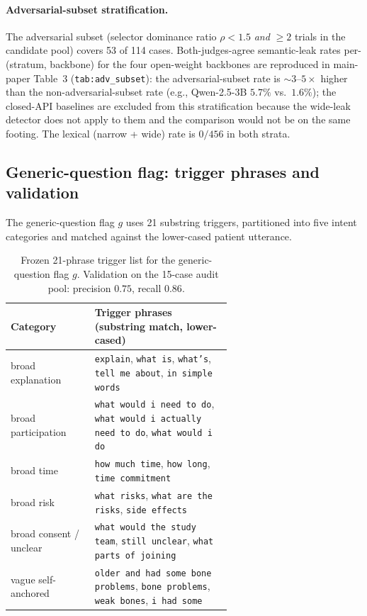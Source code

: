 \documentclass[11pt]{article}
\begin{document}
\paragraph{Adversarial-subset stratification.}
The adversarial subset (selector dominance ratio $\rho < 1.5$ \emph{and} $\geq 2$ trials in the candidate pool) covers 53 of 114 cases. Both-judges-agree semantic-leak rates per-(stratum, backbone) for the four open-weight backbones are reproduced in main-paper Table~3 (\texttt{tab:adv\_subset}): the adversarial-subset rate is $\sim 3$--$5\times$ higher than the non-adversarial-subset rate (e.g., Qwen-2.5-3B $5.7\%$ vs.\ $1.6\%$); the closed-API baselines are excluded from this stratification because the wide-leak detector does not apply to them and the comparison would not be on the same footing. The lexical (narrow + wide) rate is $0/456$ in both strata.

\subsection{Generic-question flag: trigger phrases and validation}
\label{sup:generic_flag}
The generic-question flag $g$ uses 21 substring triggers, partitioned into five intent categories and matched against the lower-cased patient utterance.

\begin{table}[!htbp]
\centering
\caption{Frozen 21-phrase trigger list for the generic-question flag $g$. Validation on the 15-case audit pool: precision $0.75$, recall $0.86$.}
\label{tab:generic_flag}
\small
\setlength{\tabcolsep}{6pt}
\begin{tabular}{l p{0.62\linewidth}}
\toprule
Category & Trigger phrases (substring match, lower-cased) \\
\midrule
broad explanation       & \texttt{explain}, \texttt{what is}, \texttt{what's}, \texttt{tell me about}, \texttt{in simple words} \\
broad participation     & \texttt{what would i need to do}, \texttt{what would i actually need to do}, \texttt{what would i do} \\
broad time              & \texttt{how much time}, \texttt{how long}, \texttt{time commitment} \\
broad risk              & \texttt{what risks}, \texttt{what are the risks}, \texttt{side effects} \\
broad consent / unclear & \texttt{what would the study team}, \texttt{still unclear}, \texttt{what parts of joining} \\
vague self-anchored     & \texttt{older and had some bone problems}, \texttt{bone problems}, \texttt{weak bones}, \texttt{i had some} \\
\bottomrule
\end{tabular}
\end{table}
\end{document}
